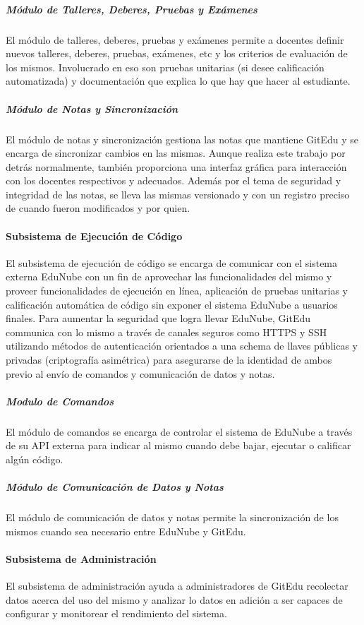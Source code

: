 \subparagraph{Módulo de Talleres, Deberes, Pruebas y Exámenes}
El módulo de talleres, deberes, pruebas y exámenes permite a docentes definir nuevos talleres, deberes, pruebas, exámenes, etc y los criterios de evaluación de los mismos. Involucrado en eso son pruebas unitarias (si desee calificación automatizada) y documentación que explica lo que hay que hacer al estudiante.

\subparagraph{Módulo de Notas y Sincronización}
El módulo de notas y sincronización gestiona las notas que mantiene GitEdu y se encarga de sincronizar cambios en las mismas. Aunque realiza este trabajo por detrás normalmente, también proporciona una interfaz gráfica para interacción con los docentes respectivos y adecuados. Además por el tema de seguridad y integridad de las notas, se lleva las mismas versionado y con un registro preciso de cuando fueron modificados y por quien.

\paragraph{Subsistema de Ejecución de Código}
 
El subsistema de ejecución de código se encarga de comunicar con el sistema externa EduNube con un fin de aprovechar las funcionalidades del mismo y proveer funcionalidades de ejecución en línea, aplicación de pruebas unitarias y calificación automática de código sin exponer el sistema EduNube a usuarios finales. Para aumentar la seguridad que logra llevar EduNube, GitEdu communica con lo mismo a través de canales seguros como HTTPS y SSH utilizando métodos de autenticación orientados a una schema de llaves públicas y privadas (criptografía asimétrica) para asegurarse de la identidad de ambos previo al envío de comandos y comunicación de datos y notas.

\subparagraph{Modulo de Comandos}
 
El módulo de comandos se encarga de controlar el sistema de EduNube a través de su API externa para indicar al mismo cuando debe bajar, ejecutar o calificar algún código.

\subparagraph{Módulo de Comunicación de Datos y Notas}
El módulo de comunicación de datos y notas permite la sincronización de los mismos cuando sea necesario entre EduNube y GitEdu.

\paragraph{Subsistema de Administración}
El subsistema de administración ayuda a administradores de GitEdu recolectar datos acerca del uso del mismo y analizar lo datos en adición a ser capaces de configurar y monitorear el rendimiento del sistema.

